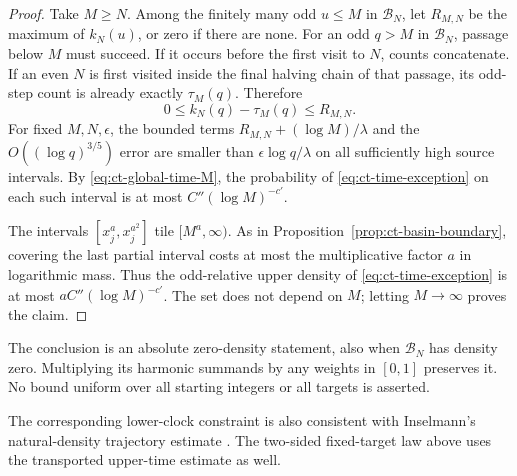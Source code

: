 \begin{proof}
Take \(M\ge N\). Among the finitely many odd \(u\le M\) in
\(\mathcal B_N\), let \(R_{M,N}\) be the maximum of \(k_N(u)\),
or zero if there are none. For an odd \(q>M\) in \(\mathcal B_N\),
passage below \(M\) must succeed. If it occurs before the first
visit to \(N\), counts concatenate. If an even \(N\) is first
visited inside the final halving chain of that passage, its odd-step
count is already exactly \(\tau_M(q)\). Therefore
\begin{equation}\label{eq:ct-final-count}
 0\le k_N(q)-\tau_M(q)\le R_{M,N}.
\end{equation}
For fixed \(M,N,\epsilon\), the bounded terms
\(R_{M,N}+(\log M)/\lambda\) and the \(O((\log q)^{3/5})\) error
are smaller than \(\epsilon\log q/\lambda\) on all sufficiently
high source intervals. By \eqref{eq:ct-global-time-M},
the probability of \eqref{eq:ct-time-exception} on each such
interval is at most \(C''(\log M)^{-c'}\).

The intervals \([x_j^a,x_j^{a^2}]\) tile \([M^a,\infty)\).
As in Proposition~\ref{prop:ct-basin-boundary}, covering the last
partial interval costs at most the multiplicative factor \(a\)
in logarithmic mass. Thus the odd-relative upper density of
\eqref{eq:ct-time-exception} is at most
\(aC''(\log M)^{-c'}\). The set does not depend on \(M\);
letting \(M\to\infty\) proves the claim.
\end{proof}

The conclusion is an absolute zero-density statement, also when
\(\mathcal B_N\) has density zero. Multiplying its harmonic
summands by any weights in \([0,1]\) preserves it. No bound
uniform over all starting integers or all targets is asserted.

The corresponding lower-clock constraint is also consistent with
Inselmann's natural-density trajectory estimate
\cite[Theorem~1.10]{Inselmann2024}. The two-sided fixed-target law
above uses the transported upper-time estimate as well.

